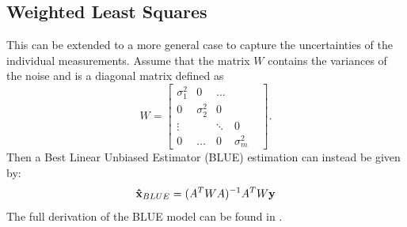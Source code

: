 \subsection{Weighted Least Squares}\label{ch:WLS}
This can be extended to a more general case to capture the uncertainties of the individual measurements. Assume that the matrix $W$ contains the variances of the noise and is a diagonal matrix defined as
\begin{equation}
W=\begin{bmatrix}
\sigma^2_1 &0 & \dots \\ 
0 & \sigma^2_2& 0& & \\
\vdots & & \ddots & 0 & \\
0 & \dots & 0 & \sigma^2_m
\end{bmatrix}.
\end{equation}
Then a Best Linear Unbiased Estimator (BLUE) estimation can instead be given by:
\begin{equation}
{\bf \hat{x}}_{BLUE}=(A^TWA)^{-1}A^TW{\bf y} \label{WLS_theory}
\end{equation}
The full derivation of the BLUE model can be found in \cite{moser1996linear}.

